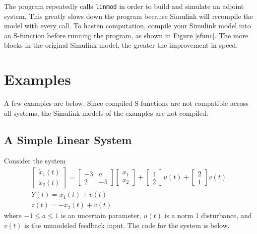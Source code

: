 \documentclass{article}
\begin{document}
The program repeatedly calls \texttt{linmod} in order to build and simulate an
adjoint system. This greatly slows down the program because Simulink will
recompile the model with every call. To hasten computation, compile your
Simulink model into an S-function before running the program, as shown in Figure
\ref{sfunc}. The more blocks in the original Simulink model, the greater the
improvement in speed.


\section{Examples}
A few examples are below. Since compiled S-functions are not compatible across
all systems, the Simulink models of the examples are not compiled.

\subsection{A Simple Linear System}
Consider the system
\begin{gather*}
\begin{bmatrix} \dot{x}_1(t) \\ \dot{x}_2(t) \end{bmatrix} = 
	\begin{bmatrix} -3 & a \\ 2 & -5 \end{bmatrix}
	\begin{bmatrix} x_1 \\ x_2 \end{bmatrix} + 
	\begin{bmatrix} 1 \\ 2 \end{bmatrix} u(t) + 
	\begin{bmatrix} 2 \\ 1 \end{bmatrix} v(t) \\
Y(t) = x_1(t) + v(t) \\
z(t) = -x_2(t) + v(t)
\end{gather*}
where $-1 \leq a \leq 1$ is an uncertain parameter, $u(t)$ is a norm 1
disturbance, and $v(t)$ is the unmodeled feedback input. The code for the system
is below.


\end{document}
